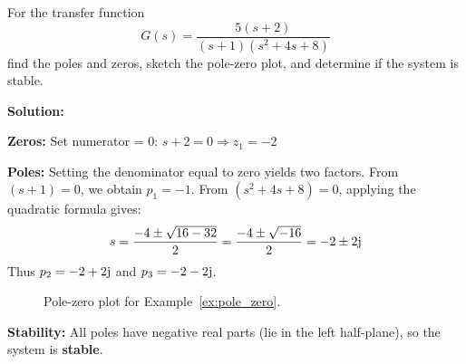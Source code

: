 \begin{example}
\label{ex:pole_zero}
For the transfer function
\begin{equation}
G(s) = \frac{5(s+2)}{(s+1)(s^2 + 4s + 8)}
\end{equation}
find the poles and zeros, sketch the pole-zero plot, and determine if the system is stable.

\textbf{Solution:}

\textbf{Zeros:} Set numerator = 0: $s + 2 = 0 \Rightarrow z_1 = -2$

\textbf{Poles:} Setting the denominator equal to zero yields two factors. From $(s+1) = 0$, we obtain $p_1 = -1$. From $(s^2 + 4s + 8) = 0$, applying the quadratic formula gives:
\begin{equation}
s = \frac{-4 \pm \sqrt{16-32}}{2} = \frac{-4 \pm \sqrt{-16}}{2} = -2 \pm 2\mathrm{j}
\end{equation}
Thus $p_2 = -2 + 2\mathrm{j}$ and $p_3 = -2 - 2\mathrm{j}$.

\begin{figure}[h]
\centering
{}
\caption{Pole-zero plot for Example~\ref{ex:pole_zero}.}
\end{figure}

\textbf{Stability:} All poles have negative real parts (lie in the left half-plane), so the system is \textbf{stable}.
\end{example}

